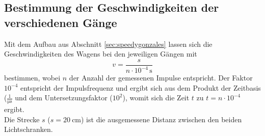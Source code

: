 \subsection{Bestimmung der Geschwindigkeiten der verschiedenen Gänge}
Mit dem Aufbau aus Abschnitt \ref{sec:speedygonzales} lassen sich die Geschwindigkeiten des Wagens bei den
jeweiligen Gängen mit
\begin{equation}
	v = \frac{s}{n \cdot 10^{-4} \,\si{\second}}
\end{equation}
bestimmen, wobei $n$ der Anzahl der gemessenen Impulse entspricht.
Der Faktor $10^{-4}$ entspricht der Impulsfrequenz und ergibt sich aus dem Produkt der
Zeitbasis ($\frac{1}{\si{\micro\second}}$ und dem Untersetzungsfaktor ($10^2$), womit sich
die Zeit $t$ zu $t = n \cdot 10^{-4}$ ergibt.\\
Die Strecke $s$ ($s = \SI{20}{\centi\meter}$) ist die ausgemessene Distanz zwischen den beiden
Lichtschranken.\\
